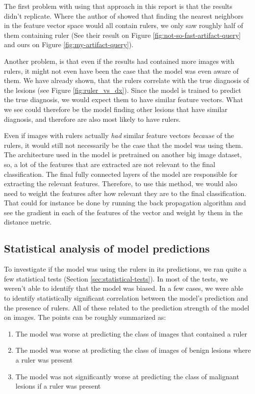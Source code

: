 The first problem with using that approach in this report is that the results didn't replicate.
Where the author of \cite{debias-not-so-fast} showed that finding the nearest neighbors in the feature
vector space would all contain rulers, we only saw roughly half of them containing ruler 
(See their result on Figure \ref{fig:not-so-fast-artifact-query} and ours on Figure \ref{fig:my-artifact-query}).

Another problem, is that even if the results had contained more images with rulers,
it might not even have been the case that the model was even aware of them.
We have already shown, that the rulers correlate with the true diagnosis of the lesions (see Figure \ref{fig:ruler_vs_dx}).
Since the model is trained to predict the true diagnosis, we would expect them to have similar feature vectors.
What we see could therefore be the model finding other lesions that have similar diagnosis,
and therefore are also most likely to have rulers.

Even if images with rulers actually \textit{had} similar feature vectors \textit{because} of the rulers,
it would still not necessarily be the case that the model was using them.
The architecture used in the model is pretrained on another big image dataset,
so, a lot of the features that are extracted are not relevant to the final classification. 
The final fully connected layers of the model are responsible for extracting the relevant features.
Therefore, to use this method, we would also need to weight the features after how relevant they are to
the final classification.
That could for instance be done by running the back propagation algorithm and see the
gradient in each of the features of the vector and weight by them in the distance metric.

\subsection{Statistical analysis of model predictions}
To investigate if the model was using the rulers in its predictions, 
we ran quite a few statistical tests (Section \ref{sec:statistical-tests}).
In most of the tests, we weren't able to identify that the model was biased.
In a few cases, we were able to identify statistically significant correlation between
the model's prediction and the presence of rulers.
All of these related to the prediction strength of the model on images.
The points can be roughly summarized as:
\begin{enumerate}
    \item The model was worse at predicting the class of images that contained a ruler
    \item The model was worse at predicting the class of images of benign lesions where a ruler was present 
    \item The model was not significantly worse at predicting the class of malignant lesions if a ruler was present
\end{enumerate}


